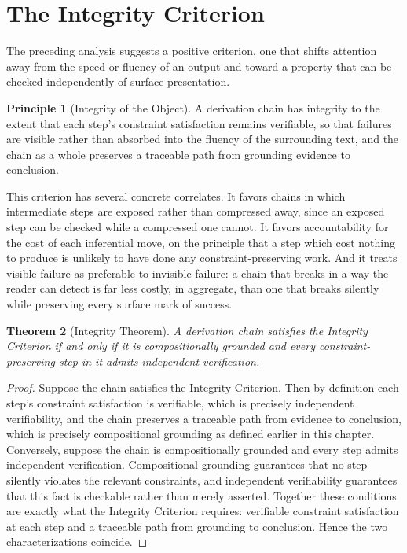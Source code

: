 \documentclass[11pt,oneside]{book}
\theoremstyle{plain}
\newtheorem{theorem}{Theorem}[chapter]
\theoremstyle{definition}
\newtheorem{principle}[theorem]{Principle}
\theoremstyle{remark}
\begin{document}
\section{The Integrity Criterion}

The preceding analysis suggests a positive criterion, one that shifts attention away from the speed or fluency of an output and toward a property that can be checked independently of surface presentation.

\begin{principle}[Integrity of the Object]
A derivation chain has integrity to the extent that each step's constraint satisfaction remains verifiable, so that failures are visible rather than absorbed into the fluency of the surrounding text, and the chain as a whole preserves a traceable path from grounding evidence to conclusion.
\end{principle}

This criterion has several concrete correlates. It favors chains in which intermediate steps are exposed rather than compressed away, since an exposed step can be checked while a compressed one cannot. It favors accountability for the cost of each inferential move, on the principle that a step which cost nothing to produce is unlikely to have done any constraint-preserving work. And it treats visible failure as preferable to invisible failure: a chain that breaks in a way the reader can detect is far less costly, in aggregate, than one that breaks silently while preserving every surface mark of success.

\begin{theorem}[Integrity Theorem]
A derivation chain satisfies the Integrity Criterion if and only if it is compositionally grounded and every constraint-preserving step in it admits independent verification.
\end{theorem}

\begin{proof}
Suppose the chain satisfies the Integrity Criterion. Then by definition each step's constraint satisfaction is verifiable, which is precisely independent verifiability, and the chain preserves a traceable path from evidence to conclusion, which is precisely compositional grounding as defined earlier in this chapter. Conversely, suppose the chain is compositionally grounded and every step admits independent verification. Compositional grounding guarantees that no step silently violates the relevant constraints, and independent verifiability guarantees that this fact is checkable rather than merely asserted. Together these conditions are exactly what the Integrity Criterion requires: verifiable constraint satisfaction at each step and a traceable path from grounding to conclusion. Hence the two characterizations coincide.
\end{proof}
\end{document}
